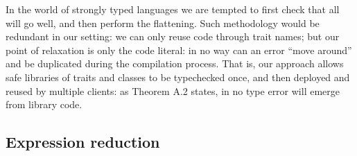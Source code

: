 %
%
%
%


 
In the world of strongly typed languages we are tempted to
first check that all will go well, and then perform the flattening. 
Such methodology would be redundant in our setting: we can only reuse code through trait names; but our point of relaxation is only the code literal: in no way can an error ``move around'' and be duplicated during the compilation process.
That is, our approach allows safe libraries of traits and classes to be typechecked once, and then deployed and reused by multiple clients: as Theorem A.2 states, in \name no type error will emerge from library code.



\subsection{Expression reduction}

